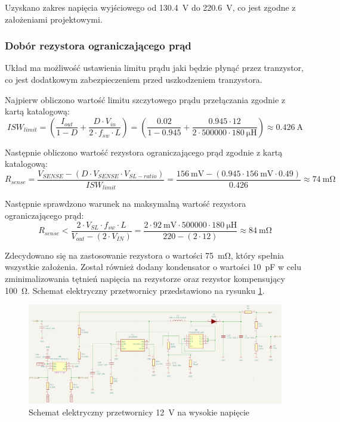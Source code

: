 \documentclass[../../main.tex]{subfiles}
\begin{document}
Uzyskano zakres napięcia wyjściowego od \SI{130.4}{\volt} do \SI{220.6}{\volt}, co jest zgodne z założeniami projektowymi.

\subsubsection{Dobór rezystora ograniczającego prąd}
Układ ma możliwość ustawienia limitu prądu jaki będzie płynąć przez tranzystor,
co jest dodatkowym zabezpieczeniem przed uszkodzeniem tranzystora.

Najpierw obliczono wartość limitu szczytowego prądu przełączania zgodnie z kartą katalogową:
\begin{equation}
    ISW_{limit} = \left(\frac{I_{out}}{1-D}+\frac{D \cdot V_{in}}{2 \cdot f_{sw} \cdot L}\right) = \left(\frac{0.02}{1-0.945}+\frac{0.945 \cdot 12}{2 \cdot 500000 \cdot \SI{180}{\micro\henry}}\right) \approx \SI{0.426}{\ampere}
\end{equation}

Następnie obliczono wartość rezystora ograniczającego prąd zgodnie z kartą katalogową:
\begin{equation}
    R_{sense} = \frac{V_{SENSE} - (D \cdot V_{SENSE} \cdot V_{SL-ratio})}{ISW_{limit}} = \frac{\SI{156}{\milli\volt} - (0.945 \cdot \SI{156}{\milli\volt} \cdot 0.49)}{0.426} \approx \SI{74}{\milli\ohm}
\end{equation}

Następnie sprawdzono warunek na maksymalną wartość rezystora ograniczającego prąd:
\begin{equation}
    R_{sense} < \frac{2 \cdot V_{SL} \cdot f_{sw} \cdot L}{V_{out} - (2 \cdot V_{IN})} = \frac{2 \cdot \SI{92}{\milli\volt} \cdot 500000 \cdot \SI{180}{\micro\henry}}{220 - (2 \cdot 12)} \approx \SI{84}{\milli\ohm}
\end{equation}

Zdecydowano się na zastosowanie rezystora o wartości \SI{75}{\milli\ohm}, który spełnia wszystkie założenia.
Został również dodany kondensator o wartości \SI{10}{\pico\farad} w celu zminimalizowania tętnień napięcia na rezystorze oraz rezystor kompensujący \SI{100}{\ohm}. Schemat elektryczny przetwornicy przedstawiono na rysunku \ref{fig:schemat}.
\begin{figure}[H]
    \centering
    \includegraphics[width=1\textwidth]{schemat.png}
    \caption{Schemat elektryczny przetwornicy \SI{12}{\volt} na wysokie napięcie}
    \label{fig:schemat}
\end{figure}
\end{document}
